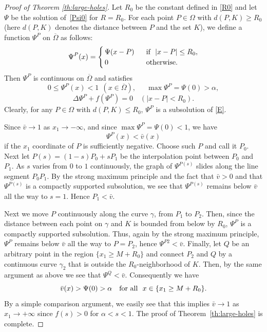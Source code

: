 \documentclass[a4paper,12pt,fullpage]{article}
\numberwithin{equation}{section}
\begin{document}
\begin{proof}[Proof of Theorem \ref{th:large-holes}]
Let $R_0$ be the constant defined in \eqref{R0} and let $\Psi$ be the solution of~\eqref{Psi0} for $R=R_0$. For each point $P\in\Omega$ with $d(P,K)\geq R_0$ (here $d(P,K)$ denotes the distance between $P$ and the set $K$), we define a function $\Psi^P$ on $\overline{\Omega}$ as follows: 
\begin{equation}\label{Psi-P}
\Psi^P(x)=
\begin{cases}
\, \Psi(x-P)\ \ & \hbox{if}\ \ |x-P|\leq R_0,\\
\, 0\ \ & \hbox{otherwise}.
\end{cases}
\end{equation}
Then $\Psi^P$ is continuous on $\overline{\Omega}$ and satisfies 
\[
0\leq \Psi^P(x)<1\ \ (x\in\overline{\Omega}),\quad \ \ \max \Psi^P=\Psi(0)>\alpha,
\]
\[
\Delta\Psi^P+f(\Psi^P)=0\quad (|x-P|<R_0).
\]
Clearly, for any $P\in\Omega$ with $d(P,K)\leq R_0$, $\Psi^P$ is a subsolution of \eqref{E}. 

Since $\bar{v}\to 1$ as $x_1\to-\infty$, and since $\max \Psi^P=\Psi(0)<1$, we have
\[
\Psi^P(x)<\bar{v}(x)
\]
if the $x_1$ coordinate of $P$ is sufficiently negative. Choose such $P$ and call it $P_0$. Next let $P(s)=(1-s)P_0+sP_1$ be the interpolation point between $P_0$ and $P_1$. As $s$ varies from $0$ to $1$ continuously, the graph of $\Psi^{P(s)}$ slides along the line segment $P_0P_1$. By the strong maximum principle and the fact that $\bar{v}>0$ and that $\Psi^{P(s)}$ is a compactly supported subsolution, we see that $\Psi^{P(s)}$ remains below $\bar{v}$ all the way to $s=1$. Hence $P_1<\bar{v}$.

Next we move $P$ continuously along the curve $\gamma$, from $P_1$ to $P_2$. Then, since the distance between each point on $\gamma$ and $K$ is bounded from below by $R_0$, $\Psi^P$ is a compactly supported subsolution. Thus, again by the strong maximum principle, $\Psi^P$ remains below $\bar{v}$ all the way to $P=P_2$, hence $\Psi^{P2}<\bar{v}$. Finally, let $Q$ be an arbitrary point in the region $\{x_1\geq M+R_0\}$ and connect $P_2$ and $Q$ by a continuous curve $\gamma_2$ that is outside the $R_0$-neighborhood of $K$. Then, by the same argument as above we see that $\Psi^{Q}<\bar{v}$. Consequently we have
\[
\bar{v}(x)>\Psi(0)>\alpha \quad\hbox{for all}\ \ x\in \{x_1\geq M+R_0\}.
\]
By a simple comparison argument, we easily see that this implies $\bar{v}\to 1$ as $x_1\to+\infty$ since $f(s)>0$ for $\alpha<s<1$. The proof of Theorem~\ref{th:large-holes} is complete.
\end{proof}
\end{document}
